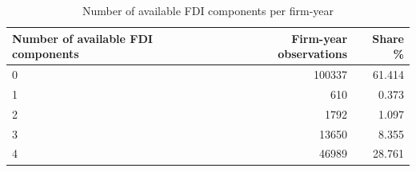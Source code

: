 \begin{table}
\caption{Number of available FDI components per firm-year}
\label{tab:fdi_component_coverage}
\begin{tabular}{lrr}
\toprule
Number of available FDI components & Firm-year observations & Share \% \\
\midrule
0 & 100337 & 61.414 \\
1 & 610 & 0.373 \\
2 & 1792 & 1.097 \\
3 & 13650 & 8.355 \\
4 & 46989 & 28.761 \\
\bottomrule
\end{tabular}
\end{table}
